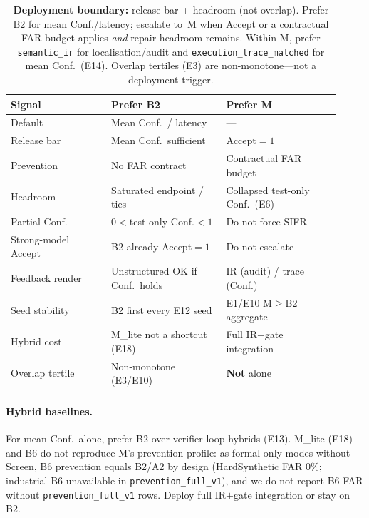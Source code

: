 \begin{table}[t]
  \centering
  \caption{\textbf{Deployment boundary:} release bar + headroom (not overlap).
    Prefer B2 for mean Conf./latency; escalate to~M when Accept or a contractual
    FAR budget applies \emph{and} repair headroom remains.
    Within M, prefer \texttt{semantic\_ir} for localisation/audit and
    \texttt{execution\_trace\_matched} for mean Conf.\ (E14).
    Overlap tertiles (E3) are non-monotone---not a deployment trigger.}
  \label{tab:deployment-boundary}
  \footnotesize
  \renewcommand{\arraystretch}{1.12}
  \begin{tabular}{@{}p{0.28\linewidth}p{0.32\linewidth}p{0.32\linewidth}@{}}
    \toprule
    \textbf{Signal} & \textbf{Prefer B2} & \textbf{Prefer M} \\
    \midrule
    Default & Mean Conf.\ / latency & --- \\
    Release bar & Mean Conf.\ sufficient & $\mathrm{Accept}{=}1$ \\
    Prevention & No FAR contract & Contractual FAR budget \\
    Headroom & Saturated endpoint / ties & Collapsed test-only Conf.\ (E6) \\
    Partial Conf. & $0{<}$test-only Conf.${<}1$ & Do not force SIFR \\
    Strong-model Accept & B2 already Accept${=}1$ & Do not escalate \\
    Feedback render & Unstructured OK if Conf.\ holds & IR (audit) / trace (Conf.) \\
    Seed stability & B2 first every E12 seed & E1/E10 M$\ge$B2 aggregate \\
    Hybrid cost & M\_lite not a shortcut (E18) & Full IR$+$gate integration \\
    Overlap tertile & Non-monotone (E3/E10) & \textbf{Not} alone \\
    \bottomrule
  \end{tabular}
\end{table}

\paragraph{Hybrid baselines.}
For mean Conf.\ alone, prefer B2 over verifier-loop hybrids (E13).
M\_lite (E18) and B6 do not reproduce M's prevention profile: as formal-only
modes without Screen, B6 prevention equals B2/A2 by design (HardSynthetic FAR
0\%; industrial B6 unavailable in \texttt{prevention\_full\_v1}), and we do not
report B6 FAR without \texttt{prevention\_full\_v1} rows.
Deploy full IR$+$gate integration or stay on B2.

